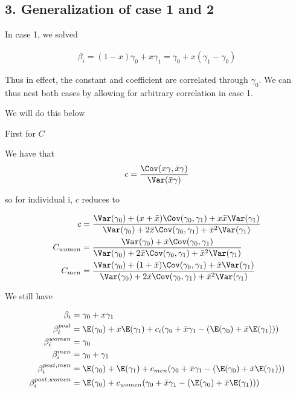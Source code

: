 \subsection*{3. Generalization of case 1 and 2}  \label{sssec:num3}

In case 1, we solved 

\begin{align*}
	\beta_i = (1 - x) \gamma_0 + x \gamma_1 = \gamma_0 + x(\gamma_1 - \gamma_0)
\end{align*} 

Thus in effect, the constant and coefficient are correlated through $\gamma_0$. We can thus nest both cases by allowing for arbitrary correlation in case 1.


We will do this below

First for $C$ 

We have that
\begin{align*}
	c = \frac{\Cov (x \gamma, \bar{x} \gamma)}{ \Var( \bar{x} \gamma )}
\end{align*} 

so for individual i, $c$ reduces to

\begin{align*}
		c &= \frac{\Var(\gamma_0) + (x + \bar{x}) \Cov(\gamma_0, \gamma_1) + x \bar{x} \Var(\gamma_1)}{\Var(\gamma_0) + 2 \bar{x} \Cov(\gamma_0, \gamma_1) + \bar{x}^2\Var(\gamma_1)} \\
		C_{women} &= \frac{\Var(\gamma_0) + \bar{x} \Cov(\gamma_0, \gamma_1)}{\Var(\gamma_0) + 2 \bar{x} \Cov(\gamma_0, \gamma_1) + \bar{x}^2\Var(\gamma_1)} \\
	C_{men} &= \frac{\Var(\gamma_0) + (1 + \bar{x}) \Cov(\gamma_0, \gamma_1) + \bar{x} \Var(\gamma_1)}{\Var(\gamma_0) + 2 \bar{x} \Cov(\gamma_0, \gamma_1) + \bar{x}^2\Var(\gamma_1)} \\
\end{align*} 

We still have

\begin{align*}
	\beta_i &= \gamma_0 + x \gamma_1 \\
	\beta_{i}^{post} &= \E(\gamma_0) + x \E(\gamma_1)  + c_i ( \gamma_0 + \bar{x} \gamma_1 - (\E(\gamma_0) + \bar{x} \E(\gamma_1))) \\
	\beta_i^{women} &= \gamma_0 \\
	\beta_i^{men} &= \gamma_0 + \gamma_1 \\
	\beta_i^{post,men} &= \E(\gamma_0) + \E(\gamma_1)  + c_{men} ( \gamma_0 + \bar{x} \gamma_1 - (\E(\gamma_0) + \bar{x} \E(\gamma_1))) \\
	\beta_i^{post, women} &= \E(\gamma_0) +  c_{women} ( \gamma_0 + \bar{x} \gamma_1 - (\E(\gamma_0) + \bar{x} \E(\gamma_1))) \\
\end{align*} 

